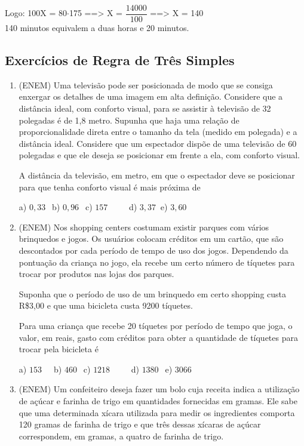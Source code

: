 \begin{multicols*}{2}
	Logo:   100X = 80$\cdot$175    ==>  X = $\dfrac{14000}{100}$    ==>   X = 140\\
	
	140 minutos equivalem a duas horas e 20 minutos.
	
	\subsection{Exercícios de Regra de Três Simples}
	
		\begin{enumerate}
		
		\item (ENEM) Uma televisão pode ser posicionada de modo que se consiga enxergar os detalhes de uma imagem em alta definição. Considere que a distância ideal, com conforto visual, para se assistir à televisão de 32 polegadas
é de 1,8 metro. Supunha que haja uma relação de proporcionalidade direta entre o tamanho da tela (medido
em polegada) e a distância ideal. Considere que um espectador dispõe de uma televisão de 60 polegadas e que
ele deseja se posicionar em frente a ela, com conforto visual.

A distância da televisão, em metro, em que o espectador deve se posicionar para que tenha conforto visual é mais
próxima de

	a) $0,33 \ \ $ b) $0,96 \ \ $ c) $157 \ \ \ \ \ \ \ \ \ \ $ d) $3,37 \ $ e) $3,60 \ \ $

		\item (ENEM) Nos shopping centers costumam existir parques com vários brinquedos e jogos. Os usuários
colocam créditos em um cartão, que são descontados por cada período de tempo de uso dos jogos. Dependendo da
pontuação da criança no jogo, ela recebe um certo número de tíquetes para trocar por produtos nas lojas dos parques.

Suponha que o período de uso de um brinquedo em certo shopping custa R\$3,00 e que uma bicicleta custa 9200 tíquetes.

Para uma criança que recebe 20 tíquetes por período de tempo que joga, o valor, em reais, gasto com créditos para
obter a quantidade de tíquetes para trocar pela bicicleta é

	a) $153 \ \ \ \ \ $ b) $460 \ \ $ c) $1218 \ \ \ \ \ \ \ \ \ \ $ d) $1380 \ \ $ e) $3066 \ \ $

		\item (ENEM) Um confeiteiro deseja fazer um bolo cuja receita indica a utilização de açúcar e farinha de trigo em
quantidades fornecidas em gramas. Ele sabe que uma determinada xícara utilizada para medir os ingredientes
comporta 120 gramas de farinha de trigo e que três dessas xícaras de açúcar correspondem, em gramas, a quatro de
farinha de trigo.


\end{enumerate}
\end{multicols*}
